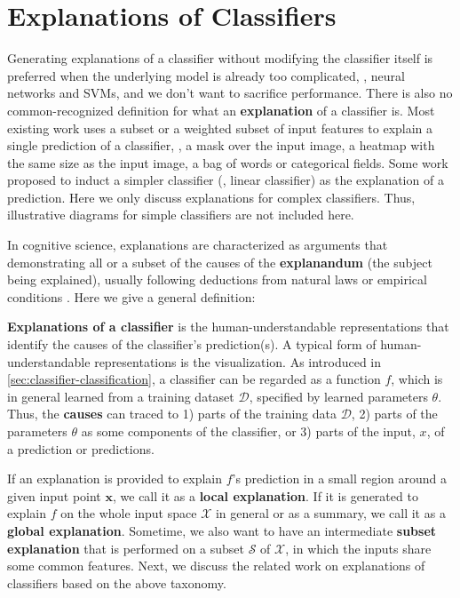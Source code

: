 
\section{Explanations of Classifiers}

Generating explanations of a classifier without modifying the classifier itself is preferred when the underlying model is already too complicated, \eg, neural networks and SVMs, and we don't want to sacrifice performance. There is also no common-recognized definition for what an \textbf{explanation} of a classifier is. Most existing work uses a subset or a weighted subset of input features to explain a single prediction of a classifier, \eg, a mask over the input image, a heatmap with the same size as the input image, a bag of words or categorical fields. Some work \cite{ribeiro2016kdd} proposed to induct a simpler classifier (\eg, linear classifier) as the explanation of a prediction. Here we only discuss explanations for complex classifiers. Thus, illustrative diagrams for simple classifiers are not included here.

In cognitive science, explanations are characterized as arguments that demonstrating all or a subset of the causes of the \textbf{explanandum} (the subject being explained), usually following deductions from natural laws or empirical conditions \cite{hempel1948explanation,lombrozo2006explanation}. Here we give a general definition: 

\textbf{Explanations of a classifier} is the human-understandable representations that identify the causes of the classifier's prediction(s). A typical form of human-understandable representations is the visualization. As introduced in \autoref{sec:classifier-classification}, a classifier can be regarded as a function $f$, which is in general learned from a training dataset $\mathcal{D}$, specified by learned parameters $\theta$. Thus, the \textbf{causes} can traced to 1) parts of the training data $\mathcal{D}$, 2) parts of the parameters $\theta$ as some components of the classifier, or 3) parts of the input, $x$, of a prediction or predictions. 

If an explanation is provided to explain $f$'s prediction in a small region around a given input point $\mathbf{x}$, we call it as a \textbf{local explanation}. If it is generated to explain $f$ on the whole input space $\mathcal{X}$ in general or as a summary, we call it as a \textbf{global explanation}. Sometime, we also want to have an intermediate \textbf{subset explanation} that is performed on a subset $\mathcal{S}$ of $\mathcal{X}$, in which the inputs share some common features. 
Next, we discuss the related work on explanations of classifiers based on the above taxonomy. 

